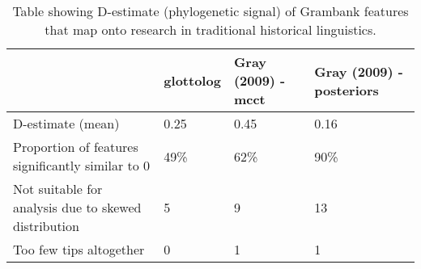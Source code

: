 \begin{table}[ht]
\centering
\begin{tabular}{p{6cm}p{2.2cm}p{2.2cm}p{2.2cm}}
  \hline
  & glottolog & Gray (2009) - mcct & Gray (2009) - posteriors \\ 
  \hline
D-estimate (mean) & 0.25 & 0.45 & 0.16 \\ 
  Proportion of features significantly similar to 0 & 49\% & 62\% & 90\% \\ 
  Not suitable for analysis due to skewed distribution & 5 & 9 & 13 \\ 
  Too few tips altogether & 0 & 1 & 1 \\ 
   \hline
\end{tabular}
\caption{Table showing D-estimate (phylogenetic signal) of Grambank features that map onto research in traditional historical linguistics.} 
\label{d_estimate_summary}
\end{table}
